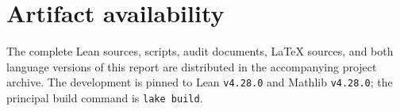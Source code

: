 \documentclass[11pt]{article}
\begin{document}
\section*{Artifact availability}
The complete Lean sources, scripts, audit documents, LaTeX sources, and both language
versions of this report are distributed in the accompanying project archive. The development
is pinned to Lean \texttt{v4.28.0} and Mathlib \texttt{v4.28.0}; the principal build command is
\lstinline{lake build}.



\end{document}
